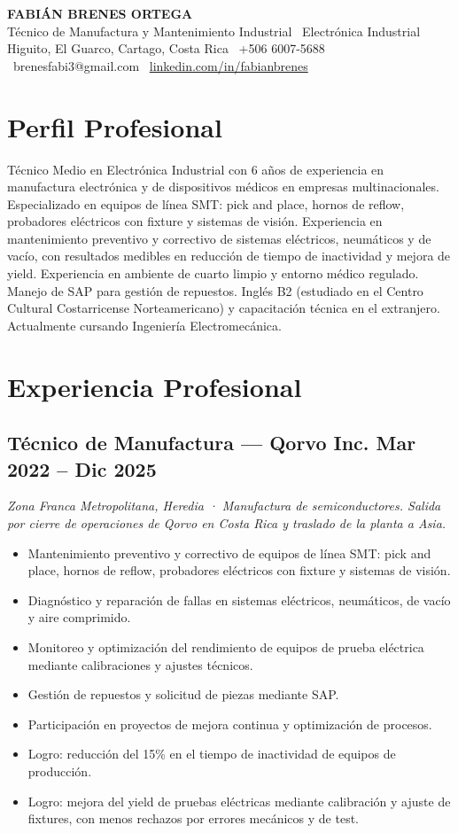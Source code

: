 \documentclass[10.5pt]{article}
\begin{document}
\begin{center}
{\Huge \textbf{FABIÁN BRENES ORTEGA}} \\[3pt]
{\large Técnico de Manufactura y Mantenimiento Industrial \textbar\ Electrónica Industrial} \\[3pt]
{\small \color{midgray} Higuito, El Guarco, Cartago, Costa Rica \textbar\ +506 6007-5688 \textbar\ brenesfabi3@gmail.com \textbar\ \href{https://linkedin.com/in/fabianbrenes}{linkedin.com/in/fabianbrenes}}
\end{center}

\section*{Perfil Profesional}
Técnico Medio en Electrónica Industrial con 6 años de experiencia en manufactura electrónica y de dispositivos médicos en empresas multinacionales. Especializado en equipos de línea SMT: pick and place, hornos de reflow, probadores eléctricos con fixture y sistemas de visión. Experiencia en mantenimiento preventivo y correctivo de sistemas eléctricos, neumáticos y de vacío, con resultados medibles en reducción de tiempo de inactividad y mejora de yield. Experiencia en ambiente de cuarto limpio y entorno médico regulado. Manejo de SAP para gestión de repuestos. Inglés B2 (estudiado en el Centro Cultural Costarricense Norteamericano) y capacitación técnica en el extranjero. Actualmente cursando Ingeniería Electromecánica.

\section*{Experiencia Profesional}

\subsection*{Técnico de Manufactura --- Qorvo Inc. \hfill Mar 2022 -- Dic 2025}
\textit{Zona Franca Metropolitana, Heredia · Manufactura de semiconductores. Salida por cierre de operaciones de Qorvo en Costa Rica y traslado de la planta a Asia.}
\begin{itemize}
\item Mantenimiento preventivo y correctivo de equipos de línea SMT: pick and place, hornos de reflow, probadores eléctricos con fixture y sistemas de visión.
\item Diagnóstico y reparación de fallas en sistemas eléctricos, neumáticos, de vacío y aire comprimido.
\item Monitoreo y optimización del rendimiento de equipos de prueba eléctrica mediante calibraciones y ajustes técnicos.
\item Gestión de repuestos y solicitud de piezas mediante SAP.
\item Participación en proyectos de mejora continua y optimización de procesos.
\item Logro: reducción del 15\% en el tiempo de inactividad de equipos de producción.
\item Logro: mejora del yield de pruebas eléctricas mediante calibración y ajuste de fixtures, con menos rechazos por errores mecánicos y de test.
\end{itemize}
\end{document}
